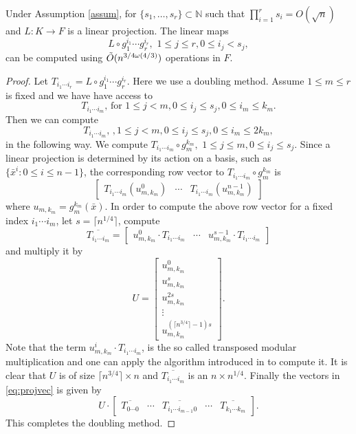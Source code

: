 \begin{lemma}\label{lem:transmodcomp}
Under Assumption \ref{assum}, for $\lbrace s_1, \ldots, s_r \rbrace \subset \mathbb{N}$
such that $\prod_{i = 1}^r s_i = O(\sqrt{n})$
 and $L: K\rightarrow F$ is a linear projection. The linear maps
$$L \circ g_1^{i_1} \cdots g_r^{i_r}, \,\, 1\leq j \leq r, 0 \leq i_j < s_j, $$ can be computed using $\tilde{O}(n^{3/4 \omega(4/3)})$ operations in $F$. 
\end{lemma} 

\begin{proof}
Let $T_{i_1\cdots i_r} = L \circ g_1^{i_1}\cdots g_r^{i_r}$. Here we use a doubling method. Assume $1 \leq m \leq r$ is fixed and we have have access to 
$$T_{i_1\cdots i_m}, \, \mathrm{for}\,\, 1\leq j < m, 0 \leq i_j \leq s_j, 0 \leq i_m \leq k_m.$$
Then we can compute 
$$T_{i_1\cdots i_m}, \, , 1 \leq j < m, 0 \leq i_j \leq s_j, 0 \leq i_m \leq 2k_m,$$
in the following way. We compute 
$T_{i_1 \cdots i_m} \circ g_m^{k_m}, \,\, 1\leq j \leq m, 0 \leq i_j \leq s_j.$
 Since a linear projection is determined by its action on a basis, such as 
$\lbrace\bar{x}^i: 0\leq i \leq n-1 \rbrace$, the corresponding row vector to $T_{i_1 \cdots i_m} \circ g_m^{k_m}$ is 
\begin{equation}\label{eq:projvec}
\begin{bmatrix} T_{i_1 \cdots i_m}(u_{m,k_m}^0) & \cdots & T_{i_1 \cdots i_m}(u_{m,k_m}^{n-1}) \end{bmatrix}
\end{equation}
where $u_{m,k_m} = g_m^{k_m}(\bar{x})$. In order to compute the above row vector for a fixed index $i_1 \cdots i_m$, let $s = \lceil n^{1/4} \rceil$, compute
$$\overline{T_{i_1 \cdots i_m}} = \left[\begin{array}{c|c|c}
u_{m,k_m}^0\cdot T_{i_1 \cdots i_m} & \cdots & u_{m,k_m}^{s-1}\cdot T_{i_1 \cdots i_m}
\end{array} \right]$$
and multiply it by 
$$ U = \left[
\begin{array}{c}
u_{m,k_m}^0\\
\hline
u_{m,k_m}^{s}\\
\hline
u_{m,k_m}^{2s}\\
\hline
\vdots\\
\hline
u_{m,k_m}^{(\lceil n^{3/4} \rceil-1)s}
\end{array} \right].$$
Note that the term $u_{m,k_m}^i \cdot T_{i_1 \cdots i_m}$, is the so called transposed modular multiplication and one can apply the algorithm introduced in \cite{Shoup} to compute it. It is clear that $U$ is of size 
$\lceil n^{3/4} \rceil \times n$ and $\overline{T_{i_1 \cdots i_m}}$ is an $n \times n^{1/4}$. Finally the vectors in \eqref{eq:projvec}
is given by
$$
U \cdot \left[\begin{array}{c|c|c|c|c}
\overline{T_{0 \cdots 0}} & \cdots &\overline{T_{i_1 \cdots i_{m-1}0}} & \cdots & \overline{T_{k_1 \cdots k_m}}
\end{array}\right].
$$
This completes the doubling method.


\end{proof}
